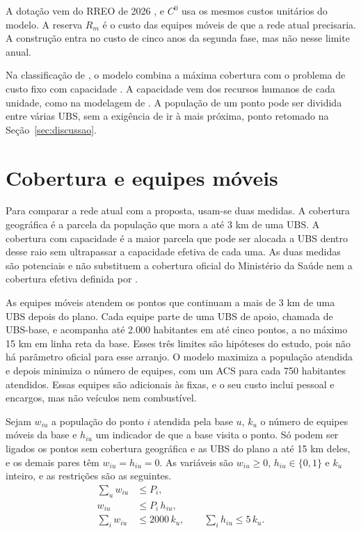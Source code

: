 \documentclass[12pt,a4paper,oneside]{report}
\begin{document}
A dotação vem do RREO de 2026 \citep{tesouro2026}, e $C^0$ usa os mesmos custos unitários do modelo. A
reserva $R_m$ é o custo das equipes móveis de que a rede atual precisaria. A construção entra no custo de cinco anos da segunda fase, mas não nesse limite anual.

Na classificação de \citet{daskin2008}, o modelo combina a máxima cobertura \citep{church1974} com o
problema de custo fixo com capacidade \citep{ahmadi2017}. A capacidade vem dos recursos humanos de cada
unidade, como na modelagem de \citet{contreras2019}. A população de um ponto pode ser dividida entre
várias UBS, sem a exigência de ir à mais próxima, ponto retomado na Seção~\ref{sec:discussao}.

\section{Cobertura e equipes móveis}\label{sec:movel}
Para comparar a rede atual com a proposta, usam-se duas medidas. A cobertura geográfica é a parcela da
população que mora a até 3 km de uma UBS. A cobertura com capacidade é a maior parcela que pode ser
alocada a UBS dentro desse raio sem ultrapassar a capacidade efetiva de cada uma. As duas medidas são
potenciais e não substituem a cobertura oficial do Ministério da Saúde \citep{aps2026} nem a cobertura
efetiva definida por \citet{shengelia2005}.

As equipes móveis atendem os pontos que continuam a mais de 3 km de uma UBS depois do plano. Cada equipe
parte de uma UBS de apoio, chamada de UBS-base, e acompanha até 2.000 habitantes em até cinco pontos, a no máximo
15 km em linha reta da base. Esses três limites são hipóteses do estudo, pois não há parâmetro oficial para
esse arranjo. O modelo maximiza a população atendida e depois minimiza o número de equipes, com
um ACS para cada 750 habitantes atendidos. Essas equipes são adicionais às fixas, e o seu custo inclui
pessoal e encargos, mas não veículos nem combustível.

Sejam $w_{iu}$ a população do ponto $i$ atendida
pela base $u$, $k_u$ o número de equipes móveis da base e $h_{iu}$ um indicador de que a base visita o
ponto. Só podem ser ligados os pontos sem cobertura geográfica e as UBS do plano a até 15 km deles, e os
demais pares têm $w_{iu}=h_{iu}=0$. As variáveis são $w_{iu}\geq0$, $h_{iu}\in\{0,1\}$ e $k_u$ inteiro, e
as restrições são as seguintes.
\begin{align}
\sum_u w_{iu}&\leq P_i,\\
w_{iu}&\leq P_i\,h_{iu},\\
\sum_i w_{iu}&\leq2000\,k_u,\qquad\sum_i h_{iu}\leq5\,k_u.
\end{align}
\end{document}
